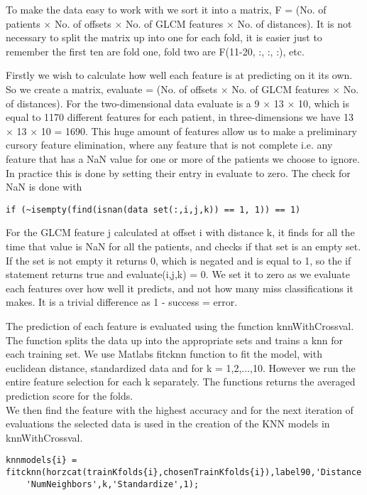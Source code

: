 To make the data easy to work with we sort it into a matrix, F = (No. of patients $\times$ No. of offsets $\times$ No. of GLCM features $\times$ No. of distances). It is not necessary to split the matrix up into one for each fold, it is easier just to remember the first ten are fold one, fold two are F(11-20, :, :, :), etc.

Firstly we wish to calculate how well each feature is at predicting on it its own. So we create a matrix, evaluate = (No. of offsets $\times$ No. of GLCM features $\times$ No. of distances). For the two-dimensional data evaluate is a 9 $\times$ 13  $\times$ 10, which is equal to 1170 different features for each patient, in three-dimensions we have 13 $\times$  13  $\times$  10 = 1690. This huge amount of features allow us to make a preliminary cursory feature elimination, where any feature that is not complete i.e. any feature that has a NaN value for one or more of the patients we choose to ignore. In practice this is done by setting their entry in evaluate to zero. The check for NaN is done with

\begin{lstlisting}[mathescape=true]
	if (~isempty(find(isnan(data set(:,i,j,k)) == 1, 1)) == 1)
\end{lstlisting}

For the GLCM feature j calculated at offset i with distance k, it finds for all the time that value is NaN for all the patients, and checks if that set is an empty set. If the set is not empty it returns 0, which is negated and is equal to 1, so the if statement returns true and evaluate(i,j,k) = 0. We set it to zero as we evaluate each features over how well it predicts, and not how many miss classifications it makes. It is a trivial difference as 1 - success = error.

The prediction of each feature is evaluated using the function knnWithCrossval. The function splits the data up into the appropriate sets and trains a knn for each training set. We use Matlabs fitcknn function to fit the model, with euclidean distance, standardized data and for k = 1,2,...,10. However we run the entire feature selection for each k separately. The functions returns the averaged prediction score for the folds.\\
We then find the feature with the highest accuracy and for the next iteration of evaluations the selected data is used in the creation of the KNN models in knnWithCrossval.

\begin{lstlisting}[mathescape=true]
    knnmodels{i} = fitcknn(horzcat(trainKfolds{i},chosenTrainKfolds{i}),label90,'Distance','euclidean',...
    'NumNeighbors',k,'Standardize',1);
\end{lstlisting}

